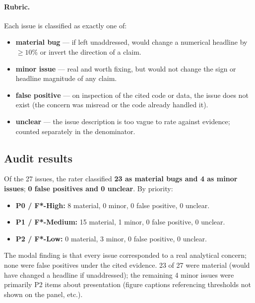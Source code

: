 \documentclass[a4paper,11pt]{article}
\begin{document}
\paragraph{Rubric.}
Each issue is classified as exactly one of:

\begin{itemize}
\item \textbf{material bug} --- if left unaddressed, would change a
  numerical headline by $\geq 10\%$ or invert the direction of a claim.
\item \textbf{minor issue} --- real and worth fixing, but would not
  change the sign or headline magnitude of any claim.
\item \textbf{false positive} --- on inspection of the cited code or
  data, the issue does not exist (the concern was misread or the code
  already handled it).
\item \textbf{unclear} --- the issue description is too vague to rate
  against evidence; counted separately in the denominator.
\end{itemize}

\subsection{Audit results}

Of the 27 issues, the rater classified \textbf{23 as material bugs
and 4 as minor issues}; \textbf{0 false positives and 0 unclear}.
By priority:

\begin{itemize}
\item \textbf{P0 / F*-High:} 8 material, 0 minor, 0 false positive,
  0 unclear.
\item \textbf{P1 / F*-Medium:} 15 material, 1 minor, 0 false positive,
  0 unclear.
\item \textbf{P2 / F*-Low:} 0 material, 3 minor, 0 false positive,
  0 unclear.
\end{itemize}

The modal finding is that every issue corresponded to a real analytical
concern; none were false positives under the cited evidence. 23 of 27
were material (would have changed a headline if unaddressed); the
remaining 4 minor issues were primarily P2 items about presentation
(figure captions referencing thresholds not shown on the panel, etc.).
\end{document}
